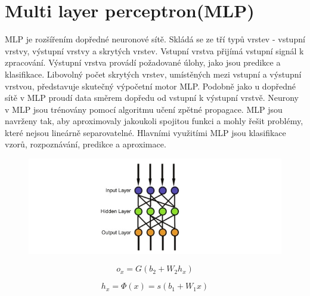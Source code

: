 \documentclass[12pt, a4paper,
twoside,        %
openright
]{report}
\begin{document}
\newpage
\section{Multi layer perceptron(MLP)}

MLP je rozšířením dopředné neuronové sítě. Skládá se ze tří typů vrstev - vstupní vrstvy, výstupní vrstvy a skrytých vrstev. Vstupní vrstva přijímá vstupní signál k zpracování. Výstupní vrstva provádí požadované úlohy, jako jsou predikce a klasifikace. Libovolný počet skrytých vrstev, umístěných mezi vstupní a výstupní vrstvou, představuje skutečný výpočetní motor MLP. Podobně jako u dopředné sítě v MLP proudí data směrem dopředu od vstupní k výstupní vrstvě. Neurony v MLP jsou trénovány pomocí algoritmu učení zpětné propagace. MLP jsou navrženy tak, aby aproximovaly jakoukoli spojitou funkci a mohly řešit problémy, které nejsou lineárně separovatelné. Hlavními využitími MLP jsou klasifikace vzorů, rozpoznávání, predikce a aproximace.
\begin{figure}[h]
	\centering
	\includegraphics[width=0.8\linewidth, height=0.8\linewidth, keepaspectratio]{image/mul.png}
	
\end{figure}
\begin{equation}
	o_x = G(b_2 + W_2 h_x)
\end{equation}

\begin{equation}
	h_x = \Phi(x) = s(b_1 + W_1 x)
\end{equation}
\end{document}
